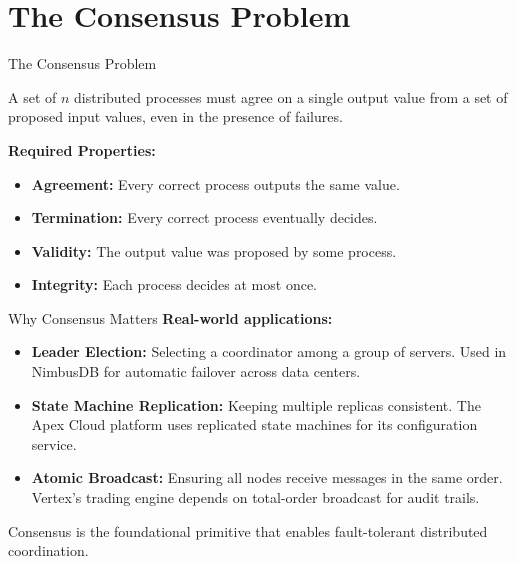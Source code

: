 \section{The Consensus Problem}

\begin{frame}{The Consensus Problem}
\begin{tcolorbox}[defblock,title={Definition (Consensus)}]
A set of $n$ distributed processes must agree on a single output value from a set of proposed input values, even in the presence of failures.
\end{tcolorbox}

\pause

\vspace{6pt}
\textbf{Required Properties:}
\begin{itemize}
  \item<2-> \textbf{Agreement:} Every correct process outputs the same value.
  \item<3-> \textbf{Termination:} Every correct process eventually decides.
  \item<4-> \textbf{Validity:} The output value was proposed by some process.
  \item<5-> \textbf{Integrity:} Each process decides at most once.
\end{itemize}
\end{frame}

\begin{frame}{Why Consensus Matters}
\textbf{Real-world applications:}

\vspace{8pt}
\begin{itemize}
  \item \textbf{Leader Election:} Selecting a coordinator among a group of servers. Used in NimbusDB for automatic failover across data centers.

  \vspace{6pt}
  \item \textbf{State Machine Replication:} Keeping multiple replicas consistent. The Apex Cloud platform uses replicated state machines for its configuration service.

  \vspace{6pt}
  \item \textbf{Atomic Broadcast:} Ensuring all nodes receive messages in the same order. Vertex's trading engine depends on total-order broadcast for audit trails.
\end{itemize}

\vspace{10pt}
\begin{tcolorbox}[exblock,title={Key Insight}]
Consensus is the foundational primitive that enables fault-tolerant distributed coordination.
\end{tcolorbox}
\end{frame}

